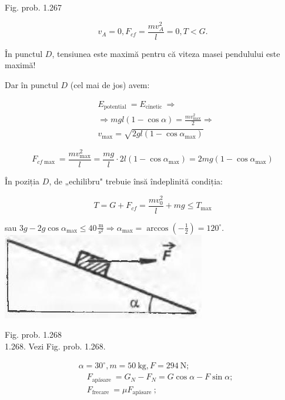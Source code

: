 \documentclass[10pt]{article}
\begin{document}
Fig. prob. 1.267

$$
v_{A}=0, F_{c f}=\frac{m v_{A}^{2}}{l}=0, T<G .
$$

În punctul $D$, tensiunea este maximă pentru că viteza masei pendulului este maximă!

Dar în punctul $D$ (cel mai de jos) avem:

$$
\begin{aligned}
& E_{\text {potential }}=E_{\text {cinetic }} \Rightarrow \\
& \Rightarrow m g l(1-\cos \alpha)=\frac{m v_{\max }^{2}}{2} \Rightarrow \\
& v_{\max }=\sqrt{2 g l\left(1-\cos \alpha_{\max }\right)}
\end{aligned}
$$

$$
F_{c f \max }=\frac{m v_{\max }^{2}}{l}=\frac{m g}{l} \cdot 2 l\left(1-\cos \alpha_{\max }\right)=2 m g\left(1-\cos \alpha_{\max }\right)
$$

În poziția $D$, de „echilibru" trebuie însă îndeplinită condiția:

$$
T=G+F_{c f}=\frac{m v_{0}^{2}}{l}+m g \leq T_{\max }
$$

sau $3 g-2 g \cos \alpha_{\max } \leq 40 \frac{\mathrm{~m}}{\mathrm{~s}^{2}} \Rightarrow \alpha_{\max }=\arccos \left(-\frac{1}{2}\right)=120^{\circ}$.\\
\includegraphics[max width=\textwidth, center]{2025_07_01_5b3ff9fa0d508c8e9f17g-257(1)}

Fig. prob. 1.268\\
1.268. Vezi Fig. prob. 1.268.

$$
\begin{aligned}
& \alpha=30^{\circ}, m=50 \mathrm{~kg}, F=294 \mathrm{~N} ; \\
& \quad F_{\text {apăsare }}=G_{N}-F_{N}=G \cos \alpha-F \sin \alpha ; \\
& \quad F_{\text {frecare }}=\mu F_{\text {apăsare }} ;
\end{aligned}
$$
\end{document}
